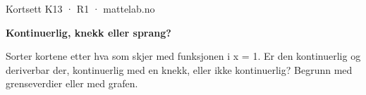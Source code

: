 \documentclass[11pt,a4paper]{article}
\begin{document}
\begin{minipage}[t]{0.8\linewidth}\vspace{0pt}
{\sffamily\small\color{dempet}Kortsett K13 · R1 · mattelab.no}\par\vspace{0.25em}
{\fontsize{20}{24}\selectfont\bfseries Kontinuerlig, knekk eller sprang?}\par\vspace{0.5em}
Sorter kortene etter hva som skjer med funksjonen i x = 1. Er den kontinuerlig og deriverbar der, kontinuerlig med en knekk, eller ikke kontinuerlig? Begrunn med grenseverdier eller med grafen.\par{}
\end{minipage}\hfill
\begin{minipage}[t]{0.15\linewidth}\vspace{0pt}\raggedleft
{}
\end{minipage}\par\vspace{0.8em}
\end{document}
